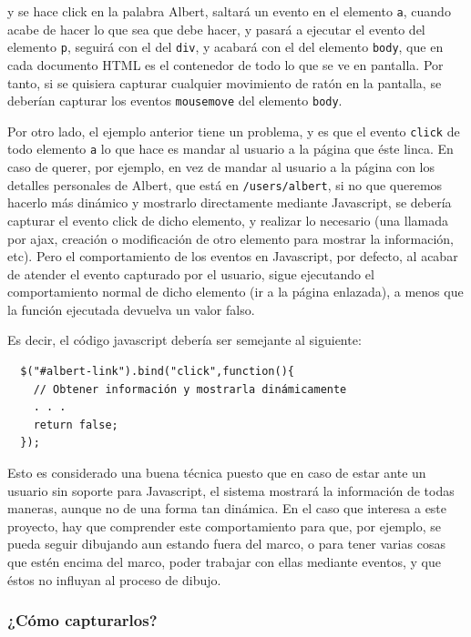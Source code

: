 y se hace click en la palabra Albert, saltará un evento en el elemento \texttt{a}, cuando acabe de hacer lo que sea que debe hacer, y pasará a ejecutar el evento del elemento \texttt{p}, seguirá con el del \texttt{div}, y acabará con el del elemento \texttt{body}, que en cada documento HTML es el contenedor de todo lo que se ve en pantalla. Por tanto, si se quisiera capturar cualquier movimiento de ratón en la pantalla, se deberían capturar los eventos \texttt{mousemove} del elemento \texttt{body}.

Por otro lado, el ejemplo anterior tiene un problema, y es que el evento \texttt{click} de todo elemento \texttt{a} lo que hace es mandar al usuario a la página que éste linca. En caso de querer, por ejemplo, en vez de mandar al usuario a la página con los detalles personales de Albert, que está en \texttt{/users/albert}, si no que queremos hacerlo más dinámico y mostrarlo directamente mediante Javascript, se debería capturar el evento click de dicho elemento, y realizar lo necesario (una llamada por ajax, creación o modificación de otro elemento para mostrar la información, etc). Pero el comportamiento de los eventos en Javascript, por defecto, al acabar de atender el evento capturado por el usuario, sigue ejecutando el comportamiento normal de dicho elemento (ir a la página enlazada), a menos que la función ejecutada devuelva un valor falso.

Es decir, el código javascript debería ser semejante al siguiente:
\begin{verbatim}
  $("#albert-link").bind("click",function(){
    // Obtener información y mostrarla dinámicamente
    . . .
    return false;
  });
\end{verbatim}

Esto es considerado una buena técnica puesto que en caso de estar ante un usuario sin soporte para Javascript, el sistema mostrará la información de todas maneras, aunque no de una forma tan dinámica. En el caso que interesa a este proyecto, hay que comprender este comportamiento para que, por ejemplo, se pueda seguir dibujando aun estando fuera del marco, o para tener varias cosas que estén encima del marco, poder trabajar con ellas mediante eventos, y que éstos no influyan al proceso de dibujo.


\subsubsection{¿Cómo capturarlos?} %
\label{ssub:como_capturarlos}

